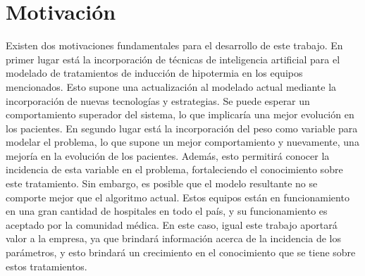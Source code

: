 \vspace{1cm}

\section{Motivación}

Existen dos motivaciones fundamentales para el desarrollo de este trabajo. En primer lugar está la incorporación de técnicas de inteligencia artificial para el modelado de tratamientos de inducción de hipotermia en los equipos mencionados. Esto supone una actualización al modelado actual mediante la incorporación de nuevas tecnologías y estrategias. Se puede esperar un comportamiento superador del sistema, lo que implicaría una mejor evolución en los pacientes. En segundo lugar está la incorporación del peso como variable para modelar el problema, lo que supone un mejor comportamiento y nuevamente, una mejoría en la evolución de los pacientes. Además, esto permitirá conocer la incidencia de esta variable en el problema, fortaleciendo el conocimiento sobre este tratamiento.
Sin embargo, es posible que el modelo resultante no se comporte mejor que el algoritmo actual. Estos equipos están en funcionamiento en una gran cantidad de hospitales en todo el país, y su funcionamiento es aceptado por la comunidad médica. En este caso, igual este trabajo aportará valor a la empresa, ya que brindará información acerca de la incidencia de los parámetros, y esto brindará un crecimiento en el conocimiento que se tiene sobre estos tratamientos.


